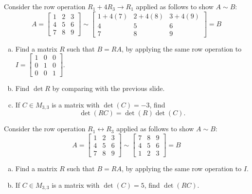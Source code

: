 \begin{activity}{5}
Consider the row operation \(R_1+4R_3\to R_1\) applied as follows to show
\(A\sim B\):
\[
A=\begin{bmatrix}1&2&3\\4&5&6\\7&8&9\end{bmatrix}
  \sim
\begin{bmatrix}1+4(7)&2+4(8)&3+4(9)\\4&5&6\\7&8&9\end{bmatrix}=B
\]
\begin{enumerate}[(a)]
\item Find a matrix \(R\) such that \(B=RA\), by applying the same row operation to 
\(I=\begin{bmatrix}1&0&0\\0&1&0\\0&0&1\end{bmatrix}\).
\item Find \(\det R\) by comparing with the previous slide.
\item If \(C \in M_{3,3}\) is a matrix with \(\det(C)= -3\), find 
\[\det(RC)=\det(R)\det(C).\]
\end{enumerate}
\end{activity}

\begin{activity}{5}
Consider the row operation \(R_1\leftrightarrow R_3\) applied as follows to show
\(A\sim B\):
\[
A=\begin{bmatrix}1&2&3\\4&5&6\\7&8&9\end{bmatrix}
  \sim
\begin{bmatrix}7&8&9\\4&5&6\\1&2&3\end{bmatrix}=B
\]
\begin{enumerate}[(a)]
\item Find a matrix \(R\) such that \(B=RA\), by applying the same row operation to \(I\).
\item If \(C \in M_{3,3}\) is a matrix with \(\det(C)= 5\), find \(\det(RC)\).
\end{enumerate}
\end{activity}

